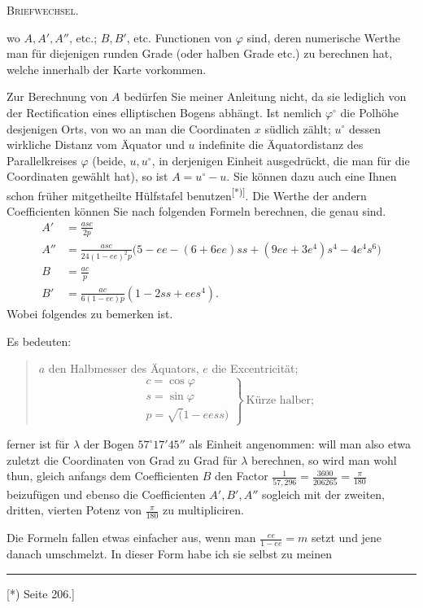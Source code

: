 \par\clearpage
{}\hfill\textsc{Briefwechsel.}\hfill\mbox{}\par\medskip
\noindent wo \(A,A',A''\), etc.; \(B,B'\), etc. Functionen von \(\varphi\) sind, deren numerische Werthe man für diejenigen runden Grade (oder halben Grade etc.) zu berechnen hat, welche innerhalb der Karte vorkommen.

Zur Berechnung von \(A\) bedürfen Sie meiner Anleitung nicht, da sie lediglich von der Rectification eines elliptischen Bogens abhängt. Ist nemlich \(\varphi^\circ\) die Polhöhe desjenigen Orts, von wo an man die Coordinaten \(x\) südlich zählt; \(u^\circ\) dessen wirkliche Distanz vom Äquator und \(u\) indefinite die Äquatordistanz des Parallelkreises \(\varphi\) (beide, \(u,u^\circ\), in derjenigen Einheit ausgedrückt, die man für die Coordinaten gewählt hat), so ist \(A=u^\circ-u\). Sie können dazu auch eine Ihnen schon früher mitgetheilte Hülfstafel benutzen\textsuperscript{[*)]}. Die Werthe der andern Coefficienten können Sie nach folgenden Formeln berechnen, die  genau sind.
\[
\begin{aligned}
A'&=\frac{asc}{2p}\\[4pt]
A''&=\frac{asc}{24(1-ee)^2p}\bigl(5-ee-(6+6ee)ss+(9ee+3e^4)s^4-4e^4s^6\bigr)\\[4pt]
B&=\frac{ac}{p}\\[4pt]
B'&=\frac{ac}{6(1-ee)p}(1-2ss+ees^4).
\end{aligned}
\]
Wobei folgendes zu bemerken ist.

Es bedeuten:
\begin{quote}
\(a\) den Halbmesser des Äquators, \(e\) die Excentricität;
\[
\left.\begin{array}{l}
c=\cos\varphi\\s=\sin\varphi\\p=\surd(1-eess)
\end{array}\right\}\ \text{Kürze halber;}
\]
\end{quote}
\noindent ferner ist für \(\lambda\) der Bogen \(57^\circ17'45''\) als Einheit angenommen: will man also etwa zuletzt die Coordinaten von Grad zu Grad für \(\lambda\) berechnen, so wird man wohl thun, gleich anfangs dem Coefficienten \(B\) den Factor \(\frac1{57{,}296}=\frac{3600}{206265}=\frac\pi{180}\) beizufügen und ebenso die Coefficienten \(A',B',A''\) sogleich mit der zweiten, dritten, vierten Potenz von \(\frac\pi{180}\) zu multipliciren.

Die Formeln fallen etwas einfacher aus, wenn man \(\frac{ee}{1-ee}=m\) setzt und jene danach umschmelzt. In dieser Form habe ich sie selbst zu meinen
\par\noindent\rule{4cm}{.4pt}\par
{\footnotesize\noindent\hspace*{\parindent}[*) Seite 206.]\par}

